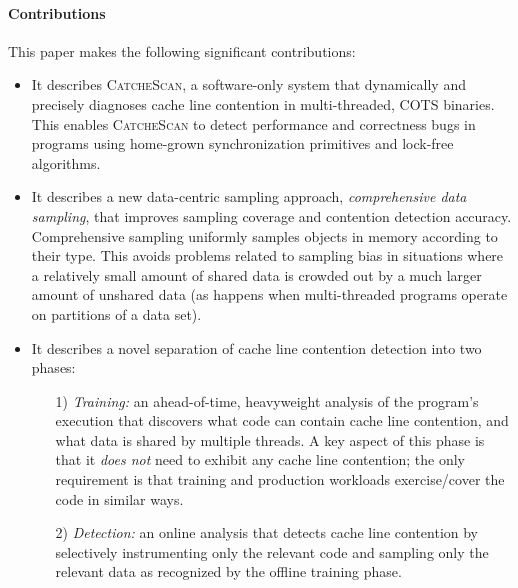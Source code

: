 \documentclass{sig-alternate}
\newcommand{\TextToolname}{CatcheScan}
\newcommand{\Toolname}{\textsc{\TextToolname{}}}
\begin{document}
\paragraph{Contributions}
This paper makes the following significant contributions:
\begin{itemize}
\item It describes \Toolname{}, a software-only system that dynamically and precisely diagnoses cache line
contention in multi-threaded, COTS binaries. This enables \Toolname{} to detect performance
and correctness bugs in programs using home-grown synchronization primitives and lock-free algorithms.

\item It describes a new data-centric sampling approach, \emph{comprehensive data sampling}, that improves
sampling coverage and contention detection accuracy. Comprehensive sampling uniformly samples objects in
memory  according to their type. This avoids problems related to sampling bias in situations where a
relatively small amount of shared data is crowded out by a much larger amount of unshared data (as happens
when multi-threaded programs operate on partitions of a data set).



\item It describes a novel separation of cache line contention detection into two phases: \begin{enumerate}
\item[1) \emph{Training:}] an ahead-of-time, heavyweight analysis of the program's execution that
discovers what code can contain cache line contention, and what data is shared by multiple threads. A key
aspect of this phase is that it \emph{does not} need to exhibit any cache line contention; the only requirement
is that training and production workloads exercise/cover the code in similar ways.


\item[2) \emph{Detection:}] an online analysis that detects cache line contention by selectively
instrumenting only the relevant code and sampling only the relevant data as recognized by the
offline training phase.
\end{enumerate}


\end{itemize}
\end{document}
